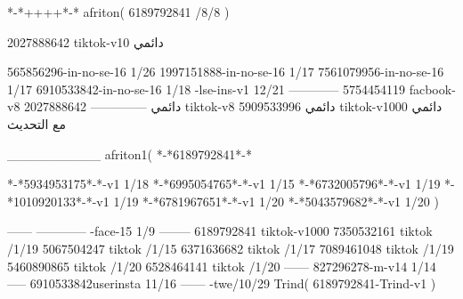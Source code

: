 *-*++++*-*
afriton(
6189792841 /8/8
)

2027888642 tiktok-v10
دائمي

565856296-in-no-se-16 1/26
1997151888-in-no-se-16 1/17
7561079956-in-no-se-16 1/17
6910533842-in-no-se-16 1/18
-lse-ins-v1 12/21
------------
5754454119 facbook-v8
دائمي
--------------
2027888642 tiktok-v8
دائمي
5909533996 tiktok-v1000
دائمي مع التحديث

__________
afriton1(
*-*6189792841*-*


*-*5934953175*-*-v1 1/18
*-*6995054765*-*-v1 1/15
*-*6732005796*-*-v1 1/19
*-*1010920133*-*-v1 1/19
*-*6781967651*-*-v1 1/20
*-*5043579682*-*-v1 1/20
)

------
------------
-face-15 1/9
--------
6189792841 tiktok-v1000
7350532161 tiktok /1/19
5067504247 tiktok /1/15
6371636682 tiktok /1/17
7089461048 tiktok /1/19
5460890865 tiktok /1/20
6528464141 tiktok /1/20
------
827296278-m-v14 1/14
-----
6910533842userinsta 11/16
------
-twe/10/29
Trind(
6189792841-Trind-v1 
)
